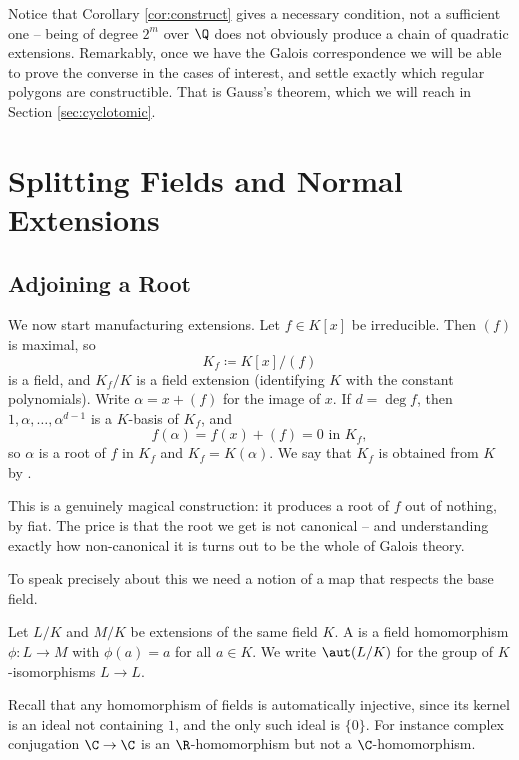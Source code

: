 Notice that Corollary \ref{cor:construct} gives a necessary condition, not a sufficient one -- being of degree $2^m$ over $\Q$ does not obviously produce a chain of quadratic extensions. Remarkably, once we have the Galois correspondence we will be able to prove the converse in the cases of interest, and settle exactly which regular polygons are constructible. That is Gauss's theorem, which we will reach in Section \ref{sec:cyclotomic}.

\section{Splitting Fields and Normal Extensions}

\subsection{Adjoining a Root}

We now start manufacturing extensions. Let $f \in K[x]$ be irreducible. Then $(f)$ is maximal, so
$$K_f \coloneqq K[x]/(f)$$
is a field, and $K_f/K$ is a field extension (identifying $K$ with the constant polynomials). Write $\alpha = x + (f)$ for the image of $x$. If $d = \deg f$, then $1, \alpha, \dots, \alpha^{d-1}$ is a $K$-basis of $K_f$, and
$$f(\alpha) = f(x) + (f) = 0 \text{ in } K_f,$$
so $\alpha$ is a root of $f$ in $K_f$ and $K_f = K(\alpha)$. We say that $K_f$ is obtained from $K$ by .

This is a genuinely magical construction: it produces a root of $f$ out of nothing, by fiat. The price is that the root we get is not canonical -- and understanding exactly how non-canonical it is turns out to be the whole of Galois theory.

To speak precisely about this we need a notion of a map that respects the base field.

\begin{definition}[$K$-homomorphism]
	Let $L/K$ and $M/K$ be extensions of the same field $K$. A  is a field homomorphism $\phi : L \to M$ with $\phi(a) = a$ for all $a \in K$. We write $\aut(L/K)$ for the group of $K$-isomorphisms $L \to L$.
\end{definition}

Recall that any homomorphism of fields is automatically injective, since its kernel is an ideal not containing $1$, and the only such ideal is $\{0\}$. For instance complex conjugation $\C \to \C$ is an $\R$-homomorphism but not a $\C$-homomorphism.

